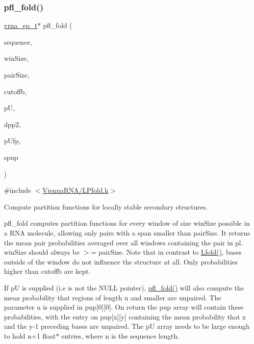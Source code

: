 \subsubsection{\texorpdfstring{pfl\+\_\+fold()}{pfl\_fold()}}
{\footnotesize\ttfamily \hyperlink{group__struct__utils_gab9ac98ab55ded9fb90043b024b915aca}{vrna\+\_\+ep\+\_\+t}$\ast$ pfl\+\_\+fold (\begin{DoxyParamCaption}\item[{char $\ast$}]{sequence,  }\item[{int}]{win\+Size,  }\item[{int}]{pair\+Size,  }\item[{float}]{cutoffb,  }\item[{double $\ast$$\ast$}]{pU,  }\item[{\hyperlink{group__struct__utils_gab9ac98ab55ded9fb90043b024b915aca}{vrna\+\_\+ep\+\_\+t} $\ast$$\ast$}]{dpp2,  }\item[{F\+I\+LE $\ast$}]{p\+Ufp,  }\item[{F\+I\+LE $\ast$}]{spup }\end{DoxyParamCaption})}



{\ttfamily \#include $<$\hyperlink{LPfold_8h}{Vienna\+R\+N\+A/\+L\+Pfold.\+h}$>$}



Compute partition functions for locally stable secondary structures. 

pfl\+\_\+fold computes partition functions for every window of size \textquotesingle{}win\+Size\textquotesingle{} possible in a R\+NA molecule, allowing only pairs with a span smaller than \textquotesingle{}pair\+Size\textquotesingle{}. It returns the mean pair probabilities averaged over all windows containing the pair in \textquotesingle{}pl\textquotesingle{}. \textquotesingle{}win\+Size\textquotesingle{} should always be $>$= \textquotesingle{}pair\+Size\textquotesingle{}. Note that in contrast to \hyperlink{group__local__mfe__fold_ga16e5a70e60835bb969eaecbe6482f1be}{Lfold()}, bases outside of the window do not influence the structure at all. Only probabilities higher than \textquotesingle{}cutoffb\textquotesingle{} are kept.

If \textquotesingle{}pU\textquotesingle{} is supplied (i.\+e is not the N\+U\+LL pointer), \hyperlink{group__local__pf__fold_ga7cdf690583871f9c158a0f91d4785cb6}{pfl\+\_\+fold()} will also compute the mean probability that regions of length \textquotesingle{}u\textquotesingle{} and smaller are unpaired. The parameter \textquotesingle{}u\textquotesingle{} is supplied in \textquotesingle{}pup\mbox{[}0\mbox{]}\mbox{[}0\mbox{]}\textquotesingle{}. On return the \textquotesingle{}pup\textquotesingle{} array will contain these probabilities, with the entry on \textquotesingle{}pup\mbox{[}x\mbox{]}\mbox{[}y\mbox{]}\textquotesingle{} containing the mean probability that x and the y-\/1 preceding bases are unpaired. The \textquotesingle{}pU\textquotesingle{} array needs to be large enough to hold n+1 float$\ast$ entries, where n is the sequence length.


